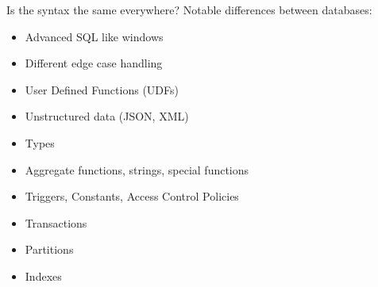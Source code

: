 \documentclass[t,pdf]{beamer}
\begin{document}
\begin{frame}{Is the syntax the same everywhere?}
Notable differences between databases:

\begin{itemize}
    \item Advanced SQL like windows
    \item Different edge case handling
    \item User Defined Functions (UDFs)
    \item Unstructured data (JSON, XML)
    \item Types
    \item Aggregate functions, strings, special functions
    \item Triggers, Constants, Access Control Policies
    \item Transactions
    \item Partitions
    \item Indexes
\end{itemize}
\end{frame}
\end{document}
